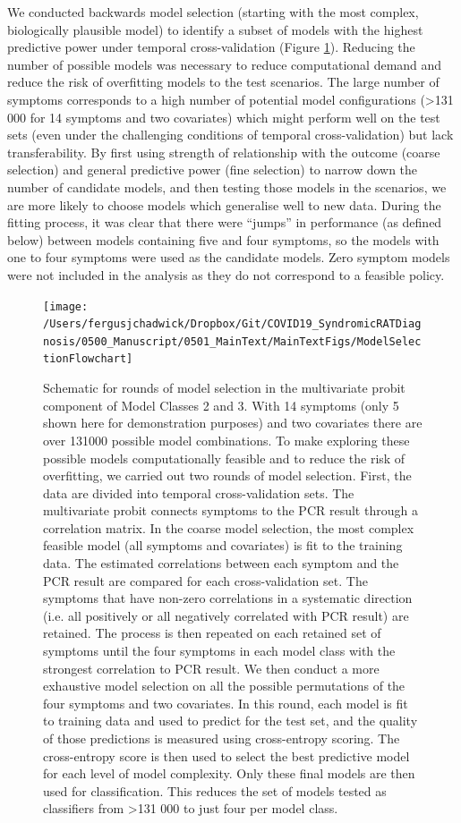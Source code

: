 \documentclass[]{elsarticle} %
\begin{document}
We conducted backwards model selection (starting with the most complex, biologically plausible model) to identify a subset of models with the highest predictive power under temporal cross-validation (Figure \ref{fig:modsel-flowchart}).
Reducing the number of possible models was necessary to reduce computational demand and reduce the risk of overfitting models to the test scenarios.
The large number of symptoms corresponds to a high number of potential model configurations (\textgreater131 000 for 14 symptoms and two covariates) which might perform well on the test sets (even under the challenging conditions of temporal cross-validation) but lack transferability.
By first using strength of relationship with the outcome (coarse selection) and general predictive power (fine selection) to narrow down the number of candidate models, and then testing those models in the scenarios, we are more likely to choose models which generalise well to new data.
During the fitting process, it was clear that there were ``jumps'' in performance (as defined below) between models containing five and four symptoms, so the models with one to four symptoms were used as the candidate models.
Zero symptom models were not included in the analysis as they do not correspond to a feasible policy.

\begin{figure}
\texttt{[image: /Users/fergusjchadwick/Dropbox/Git/COVID19\_SyndromicRATDiagnosis/0500\_Manuscript/0501\_MainText/MainTextFigs/ModelSelectionFlowchart]} \caption{Schematic for rounds of model selection in the multivariate probit component of Model Classes 2 and 3. With 14 symptoms (only 5 shown here for demonstration purposes) and two covariates there are over 131000 possible model combinations. To make exploring these possible models computationally feasible and to reduce the risk of overfitting, we carried out two rounds of model selection. First, the data are divided into temporal cross-validation sets. The multivariate probit connects symptoms to the PCR result through a correlation matrix. In the coarse model selection, the most complex feasible model (all symptoms and covariates) is fit to the training data. The estimated correlations between each symptom and the PCR result are compared for each cross-validation set. The symptoms that have non-zero correlations in a systematic direction (i.e. all positively or all negatively correlated with PCR result) are retained. The process is then repeated on each retained set of symptoms until the four symptoms in each model class with the strongest correlation to PCR result. We then conduct a more exhaustive model selection on all the possible permutations of the four symptoms and two covariates. In this round, each model is fit to training data and used to predict for the test set, and the quality of those predictions is measured using cross-entropy scoring. The cross-entropy score is then used to select the best predictive model for each level of model complexity. Only these final models are then used for classification. This reduces the set of models tested as classifiers from >131 000 to just four per model class.}\label{fig:modsel-flowchart}
\end{figure}
\end{document}
